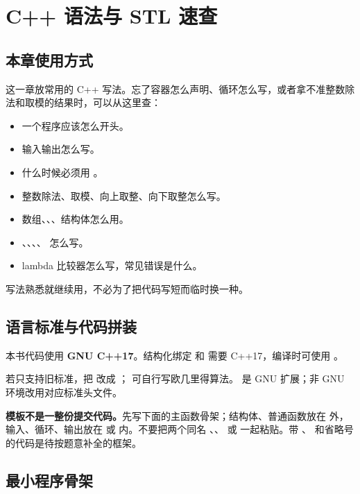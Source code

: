 \chapter{C++ 语法与 STL 速查}\label{ch:04}

\section{本章使用方式}\label{sec:04-1}

这一章放常用的 C++ 写法。忘了容器怎么声明、循环怎么写，或者拿不准整数除法和取模的结果时，可以从这里查：

\begin{itemize}
  \item 一个程序应该怎么开头。
  \item 输入输出怎么写。
  \item 什么时候必须用 。
  \item 整数除法、取模、向上取整、向下取整怎么写。
  \item 数组、、、结构体怎么用。
  \item {}、、、、 怎么写。
  \item lambda 比较器怎么写，常见错误是什么。
\end{itemize}

写法熟悉就继续用，不必为了把代码写短而临时换一种。

\section{语言标准与代码拼装}\label{sec:04-2}
本书代码使用 \textbf{GNU C++17}。结构化绑定  和  需要 C++17，编译时可使用 。

若只支持旧标准，把  改成 ； 可自行写欧几里得算法。 是 GNU 扩展；非 GNU 环境改用对应标准头文件。

\textbf{模板不是一整份提交代码。}先写下面的主函数骨架；结构体、普通函数放在  外，输入、循环、输出放在  或  内。不要把两个同名 、、 或  一起粘贴。带 、 和省略号的代码是待按题意补全的框架。

\section{最小程序骨架}\label{sec:04-3}

